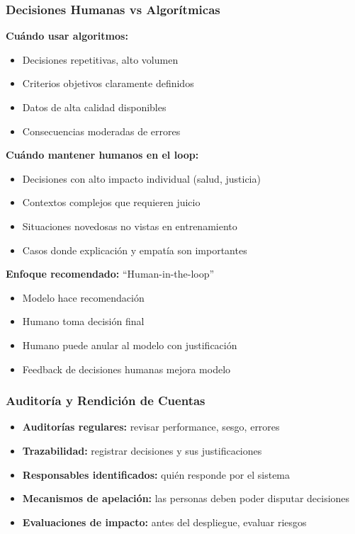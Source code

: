 \documentclass[11pt,a4paper]{article}
\begin{document}
\subsubsection{Decisiones Humanas vs Algorítmicas}

\textbf{Cuándo usar algoritmos:}
\begin{itemize}
\item Decisiones repetitivas, alto volumen
\item Criterios objetivos claramente definidos
\item Datos de alta calidad disponibles
\item Consecuencias moderadas de errores
\end{itemize}

\textbf{Cuándo mantener humanos en el loop:}
\begin{itemize}
\item Decisiones con alto impacto individual (salud, justicia)
\item Contextos complejos que requieren juicio
\item Situaciones novedosas no vistas en entrenamiento
\item Casos donde explicación y empatía son importantes
\end{itemize}

\textbf{Enfoque recomendado:} ``Human-in-the-loop''
\begin{itemize}
\item Modelo hace recomendación
\item Humano toma decisión final
\item Humano puede anular al modelo con justificación
\item Feedback de decisiones humanas mejora modelo
\end{itemize}

\subsubsection{Auditoría y Rendición de Cuentas}

\begin{itemize}
\item \textbf{Auditorías regulares:} revisar performance, sesgo, errores
\item \textbf{Trazabilidad:} registrar decisiones y sus justificaciones
\item \textbf{Responsables identificados:} quién responde por el sistema
\item \textbf{Mecanismos de apelación:} las personas deben poder disputar decisiones
\item \textbf{Evaluaciones de impacto:} antes del despliegue, evaluar riesgos
\end{itemize}
\end{document}
